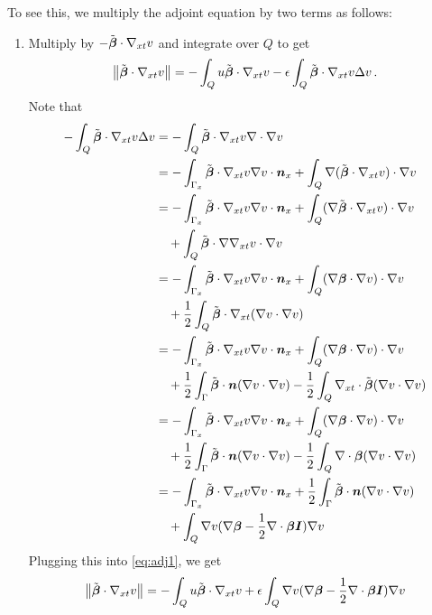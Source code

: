 \documentclass{article}
\begin{document}
To see this, we multiply the adjoint equation by two terms as follows:
\begin{enumerate}
\item Multiply by $-\tilde{\boldsymbol\beta}\cdot\nabla_{xt} v$ and integrate over $Q$ to get
\begin{equation}
\label{eq:adj1}
\left\| \tilde{\boldsymbol\beta}\cdot\nabla_{xt} v \right\|=-\int_Q u\tilde{\boldsymbol\beta}\cdot\nabla_{xt} v-\epsilon\int_Q\tilde{\boldsymbol\beta}\cdot\nabla_{xt} v\Delta v\,.
\end{equation}
Note that
\begin{align*}
-\int_Q\tilde\bfbeta\cdot\Gradxt v\Delta v&=-\int_Q\tilde\bfbeta\cdot\Gradxt v\Div\Grad v \\
%
&=-\int_{\Gamma_x}\tilde\bfbeta\cdot\Gradxt v\Grad v\cdot\bfn_x
+\int_Q\Grad(\tilde\bfbeta\cdot\Gradxt v)\cdot\Grad v \\
%
&=-\int_{\Gamma_x}\tilde\bfbeta\cdot\Gradxt v\Grad v\cdot\bfn_x
+\int_Q(\Grad\tilde\bfbeta\cdot\Gradxt v)\cdot\Grad v\\
&\quad+\int_Q\tilde\bfbeta\cdot\Grad\Gradxt v\cdot\Grad v\\
%
&=-\int_{\Gamma_x}\tilde\bfbeta\cdot\Gradxt v\Grad v\cdot\bfn_x
+\int_Q(\Grad\bfbeta\cdot\Grad v)\cdot\Grad v\\
&\quad+\frac{1}{2}\int_Q\tilde\bfbeta\cdot\Gradxt(\Grad v\cdot\Grad v)\\
%
&=-\int_{\Gamma_x}\tilde\bfbeta\cdot\Gradxt v\Grad v\cdot\bfn_x
+\int_Q(\Grad\bfbeta\cdot\Grad v)\cdot\Grad v\\
&\quad+\frac{1}{2}\int_\Gamma\tilde\bfbeta\cdot\bfn(\Grad v\cdot\Grad v)
-\frac{1}{2}\int_Q\Divxt\tilde\bfbeta(\Grad v\cdot\Grad v)\\
%
&=-\int_{\Gamma_x}\tilde\bfbeta\cdot\Gradxt v\Grad v\cdot\bfn_x
+\int_Q(\Grad\bfbeta\cdot\Grad v)\cdot\Grad v\\
&\quad+\frac{1}{2}\int_\Gamma\tilde\bfbeta\cdot\bfn(\Grad v\cdot\Grad v)
-\frac{1}{2}\int_Q\Div\bfbeta(\Grad v\cdot\Grad v)\\
%
&=-\int_{\Gamma_x}\tilde\bfbeta\cdot\Gradxt v\Grad v\cdot\bfn_x
+\frac{1}{2}\int_\Gamma\tilde\bfbeta\cdot\bfn(\Grad v\cdot\Grad v)\\
&\quad+\int_Q\Grad v(\Grad\bfbeta-\frac{1}{2}\Div\bfbeta\bfI)\Grad v\\
\end{align*}
Plugging this into \eqref{eq:adj1}, we get
\begin{align*}
\norm{\tilde\bfbeta\cdot\Gradxt v}
&=-\int_Q u\tilde\bfbeta\cdot\Gradxt v
+\epsilon\int_Q\Grad v(\Grad\bfbeta-\frac{1}{2}\Div\bfbeta\bfI)\Grad v\\

\end{align*}
\end{enumerate}
\end{document}
